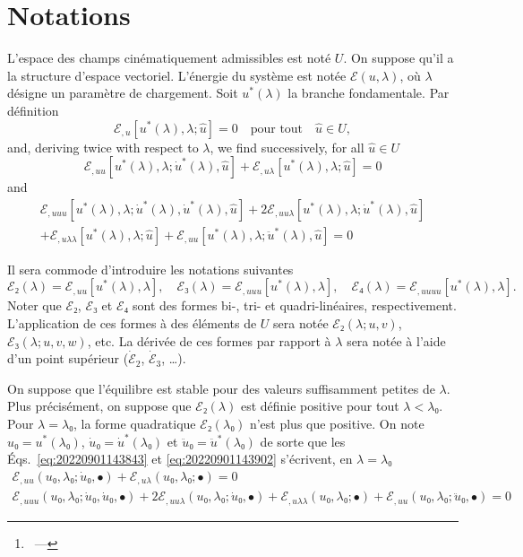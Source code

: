 \documentclass[12pt, final]{scrartcl}
\theoremstyle{definition}
\begin{document}
\title{\sbtitle}
\author{\sbauthor\thanks{\sbaddress~--- \sbemail}}
\maketitle

\section{Notations}

L'espace des champs cinématiquement admissibles est noté $U$. On suppose qu'il
a la structure d'espace vectoriel. L'énergie du système est notée $ℰ(u, λ)$,
où $λ$ désigne un paramètre de chargement. Soit $u^{\ast}(λ)$ la branche
fondamentale. Par définition
\begin{equation}
  ℰ_{,u}[u^{\ast}(λ), λ; \hat{u}]=0 \quad \text{pour tout} \quad \hat{u}∈U,
\end{equation}
and, deriving twice with respect to $λ$, we find successively, for all $\hat{u} ∈ U$
\begin{equation}
  \label{eq:20220901143843}
  ℰ_{,uu}[u^\ast(λ), λ; \dot{u}^\ast(λ), \hat{u}] + ℰ_{,uλ}[u^\ast(λ), λ; \hat{u}] = 0
\end{equation}
and
\begin{multline}
  \label{eq:20220901143902}
  ℰ_{,uuu}[u^\ast(λ), λ; \dot{u}^\ast(λ), \dot{u}^\ast(λ), \hat{u}] + 2ℰ_{,uuλ}[u^\ast(λ), λ; \dot{u}^\ast(λ), \hat{u}]\\
  + ℰ_{,uλλ}[u^\ast(λ), λ; \hat{u}] + ℰ_{,uu}[u^\ast(λ), λ; \ddot{u}^\ast(λ), \hat{u}] = 0
\end{multline}





Il sera commode d'introduire les notations suivantes
\begin{equation}
  ℰ₂(λ) = ℰ_{,uu}[u^{\ast}(λ), λ], \quad ℰ₃(λ) = ℰ_{,uuu}[u^{\ast}(λ), λ], \quad ℰ₄(λ) = ℰ_{,uuuu} [u^{\ast}(λ), λ].
\end{equation}
Noter que $ℰ₂$, $ℰ₃$ et $ℰ₄$ sont des formes bi-, tri- et
quadri-linéaires, respectivement. L'application de ces formes à des éléments de
$U$ sera notée $ℰ₂(λ; u, v)$, $ℰ₃(λ; u, v, w)$, etc. La dérivée de ces
formes par rapport à $λ$ sera notée à l'aide d'un point supérieur
($\dot{ℰ}_2$, $\dot{ℰ}_3$, \dots).

On suppose que l'équilibre est stable pour des valeurs suffisamment petites de
$λ$. Plus précisément, on suppose que $ℰ₂(λ)$ est définie positive pour tout
$λ < λ₀$. Pour $λ = λ₀$, la forme quadratique $ℰ₂(λ₀)$ n'est plus que
positive. On note $u₀ = u^{\ast}(λ₀)$, $\dot{u}₀ = \dot{u}^\ast(λ₀)$ et
$\ddot{u}₀ = \ddot{u}^\ast(λ₀)$ de sorte que les
Éqs.~\eqref{eq:20220901143843} et \eqref{eq:20220901143902} s'écrivent, en
$λ = λ₀$
\begin{gather}
  \label{eq:20220901144331}
  ℰ_{,uu}(u₀, λ₀; \dot{u}₀, \bullet) + ℰ_{,uλ}(u₀, λ₀; \bullet) = 0\\
  \label{eq:20220901144335}
  ℰ_{,uuu}(u₀, λ₀; \dot{u}₀, \dot{u}₀, \bullet) + 2ℰ_{,uuλ}(u₀, λ₀; \dot{u}₀, \bullet) + ℰ_{,uλλ}(u₀, λ₀; \bullet) + ℰ_{,uu}(u₀, λ₀; \ddot{u}₀, \bullet) = 0
\end{gather}
\end{document}
